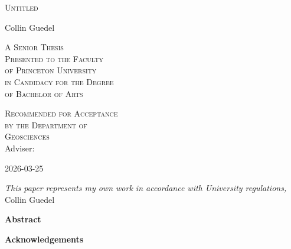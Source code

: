 \documentclass[11pt]{report}
\begin{document}

\thispagestyle{empty}
  \begin{center}
    \textsc{\LARGE Untitled} %
  \end{center}
  \vspace{.6in}
  \begin{center}
    Collin Guedel
  \end{center}
  \vspace{.6in}
  \begin{center}
    \textsc{A Senior Thesis \\ %
    Presented to the Faculty \\
    of Princeton University \\
    in Candidacy for the Degree \\
    of Bachelor of Arts}
  \end{center}
  \vspace{.3in}
  \begin{center}
    \textsc{Recommended for Acceptance \\
    by the Department of \\
    Geosciences \\}
    Adviser: %
  \end{center}
  \vspace{.3in}
  \begin{center}
    2026-03-25 %
  \end{center}
  
  \clearpage

\thispagestyle{empty}
\vspace*{3in}
\begin{center}
\emph{This paper represents my own work in accordance with University regulations,} \\
Collin Guedel
\end{center}
\clearpage

{}
\begin{center}
\Large \textbf{Abstract}
\end{center}
 
 \clearpage

{}
\begin{center}
\Large \textbf{Acknowledgements}
\end{center}
\end{document}

